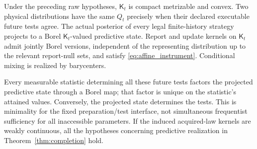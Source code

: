 \begin{theorem}\label{thm:quotient}
Under the preceding raw hypotheses, $\mathsf K_t$ is compact metrizable and convex. Two physical distributions have the same $Q_t$ precisely when their declared executable future tests agree. The actual posterior of every legal finite-history strategy projects to a Borel $\mathsf K_t$-valued predictive state. Report and update kernels on $\mathsf K_t$ admit jointly Borel versions, independent of the representing distribution up to the relevant report-null sets, and satisfy \eqref{eq:affine_instrument}. Conditional mixing is realized by barycenters.

Every measurable statistic determining all these future tests factors the projected predictive state through a Borel map; that factor is unique on the statistic's attained values. Conversely, the projected state determines the tests. This is minimality for the fixed preparation/test interface, not simultaneous frequentist sufficiency for all inaccessible parameters. If the induced acquired-law kernels are weakly continuous, all the hypotheses concerning predictive realization in Theorem~\ref{thm:completion} hold.
\end{theorem}
